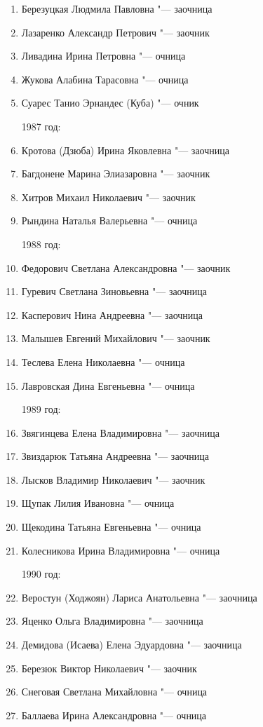 \begin{enumerate}[nosep]
{1986 год:}
	\item Березуцкая Людмила Павловна "--- заочница
	\item Лазаренко Александр Петрович "--- заочник
	\item Ливадина Ирина Петровна "--- очница
	\item Жукова Алабина Тарасовна "--- очница
	\item Суарес Танио Эрнандес (Куба) "--- очник

{1987 год:}
	\item Кротова (Дзюба) Ирина Яковлевна "--- заочница
	\item Багдонене Марина Элиазаровна "--- заочник
	\item Хитров Михаил Николаевич "--- заочник
	\item Рындина Наталья Валерьевна "--- очница

{1988 год:}
	\item Федорович Светлана Александровна "--- заочник
	\item Гуревич Светлана Зиновьевна "--- заочница
	\item Касперович Нина Андреевна "--- заочница
	\item Малышев Евгений Михайлович "--- заочник
	\item Теслева Елена Николаевна "--- очница
	\item Лавровская Дина Евгеньевна "--- очница

{1989 год:}
	\item Звягинцева Елена Владимировна "--- заочница 
	\item Звиздарюк Татьяна Андреевна "--- заочница 
	\item Лысков Владимир Николаевич "--- заочник
	\item Щупак Лилия Ивановна "--- очница
	\item Щекодина Татьяна Евгеньевна "--- очница
	\item Колесникова Ирина Владимировна "--- очница

{1990 год:}
	\item Веростун (Ходжоян) Лариса Анатольевна "--- заочница
	\item Яценко Ольга Владимировна "--- заочница
	\item Демидова (Исаева) Елена Эдуардовна "--- заочница
	\item Березюк Виктор Николаевич "--- заочник
	\item Снеговая Светлана Михайловна "--- очница
	\item Баллаева Ирина Александровна "--- очница


\end{enumerate}
